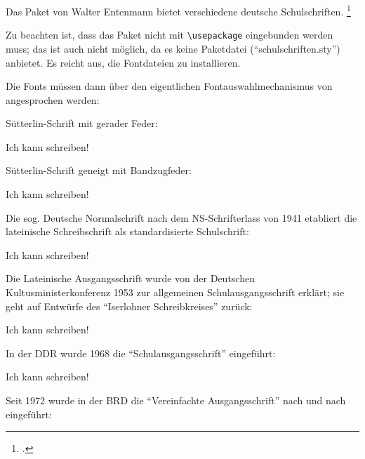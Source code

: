 
Das Paket  von Walter Entenmann bietet verschiedene deutsche Schulschriften.
\footcite[Zur Geschichte der deutschen Schulschriften sowie dem Vorgehen zu ihrer Implementierung 
in \LaTeX:][]{entenmann:dtk2012/4}

Zu beachten ist, dass das Paket nicht mit \lstinline/\usepackage/ eingebunden werden muss;
das ist auch nicht möglich, da es keine Paketdatei (\enquote{schulschriften.sty}) anbietet.
Es reicht aus, die Fontdateien zu installieren.

Die Fonts müssen dann über den eigentlichen Fontauswahlmechanismus von \LaTeXe{} angesprochen werden:

Sütterlin-Schrift mit gerader Feder:

\begin{lfgwexample}{}
{
\huge
Ich kann schreiben!}
\end{lfgwexample}

Sütterlin-Schrift geneigt mit Bandzugfeder:

\begin{lfgwexample}{}
{
\huge
Ich kann schreiben!}
\end{lfgwexample}


Die sog. Deutsche Normalschrift nach dem NS-Schrifterlass von 1941 etabliert die lateinische Schreibschrift
als standardisierte Schulschrift:

\begin{lfgwexample}{}
{
\huge
Ich kann schreiben!}
\end{lfgwexample}

Die Lateinische Ausgangsschrift wurde von der Deutschen Kultusministerkonferenz 1953 zur allgemeinen
Schulausgangsschrift erklärt; sie geht auf Entwürfe des \enquote{Iserlohner Schreibkreises} zurück:

\begin{lfgwexample}{}
{
\huge
Ich kann schreiben!}
\end{lfgwexample}

In der DDR wurde 1968 die \enquote{Schulausgangsschrift} eingeführt:

\begin{lfgwexample}{}
{
\huge
Ich kann schreiben!}
\end{lfgwexample}

Seit 1972 wurde in der BRD die \enquote{Vereinfachte Ausgangsschrift} nach und nach eingeführt:

